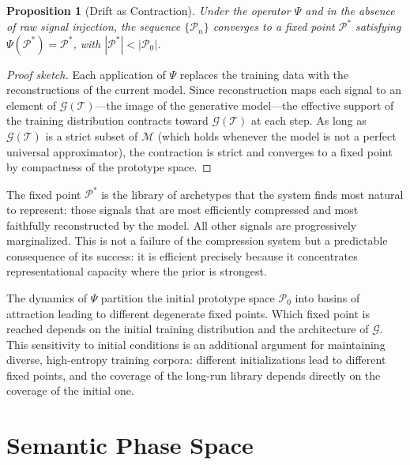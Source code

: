 \documentclass[11pt,a4paper]{article}
\newtheorem{proposition}[theorem]{Proposition}
\theoremstyle{definition}
\theoremstyle{remark}
\begin{document}
\begin{proposition}[Drift as Contraction]
Under the operator $\Psi$ and in the absence of raw signal injection, the sequence $\{\mathcal{P}_n\}$ converges to a fixed point $\mathcal{P}^*$ satisfying $\Psi(\mathcal{P}^*) = \mathcal{P}^*$, with $|\mathcal{P}^*| < |\mathcal{P}_0|$.
\end{proposition}

\begin{proof}[Proof sketch]
Each application of $\Psi$ replaces the training data with the reconstructions of the current model. Since reconstruction maps each signal to an element of $\mathcal{G}(\mathcal{T})$---the image of the generative model---the effective support of the training distribution contracts toward $\mathcal{G}(\mathcal{T})$ at each step. As long as $\mathcal{G}(\mathcal{T})$ is a strict subset of $\mathcal{M}$ (which holds whenever the model is not a perfect universal approximator), the contraction is strict and converges to a fixed point by compactness of the prototype space.
\end{proof}

The fixed point $\mathcal{P}^*$ is the library of archetypes that the system finds most natural to represent: those signals that are most efficiently compressed and most faithfully reconstructed by the model. All other signals are progressively marginalized. This is not a failure of the compression system but a predictable consequence of its success: it is efficient precisely because it concentrates representational capacity where the prior is strongest.

The dynamics of $\Psi$ partition the initial prototype space $\mathcal{P}_0$ into basins of attraction leading to different degenerate fixed points. Which fixed point is reached depends on the initial training distribution and the architecture of $\mathcal{G}$. This sensitivity to initial conditions is an additional argument for maintaining diverse, high-entropy training corpora: different initializations lead to different fixed points, and the coverage of the long-run library depends directly on the coverage of the initial one.

\section{Semantic Phase Space}
\label{sec:phase_space}
\end{document}
